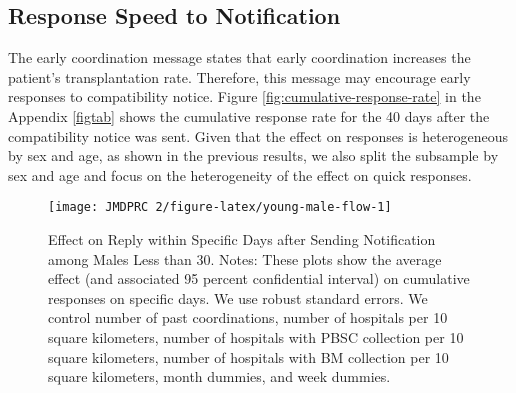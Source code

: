 \documentclass[12pt, a4paper]{article}
\begin{document}
\hypertarget{reply-speed}{%
\subsection{Response Speed to Notification}\label{reply-speed}}

The early coordination message states that early coordination increases the patient's transplantation rate. Therefore, this message may encourage early responses to compatibility notice. Figure \ref{fig:cumulative-response-rate} in the Appendix \ref{figtab} shows the cumulative response rate for the 40 days after the compatibility notice was sent. Given that the effect on responses is heterogeneous by sex and age, as shown in the previous results, we also split the subsample by sex and age and focus on the heterogeneity of the effect on quick responses.

\begin{figure}[t]
\texttt{[image: JMDPRC~2/figure-latex/young-male-flow-1]} \caption{Effect on Reply within Specific Days after Sending Notification among Males Less than 30. Notes: These plots show the average effect (and associated 95 percent confidential interval) on cumulative responses on specific days. We use robust standard errors. We control number of past coordinations, number of hospitals per 10 square kilometers, number of hospitals with PBSC collection per 10 square kilometers, number of hospitals with BM collection per 10 square kilometers, month dummies, and week dummies.}\label{fig:young-male-flow}
\end{figure}
\end{document}
